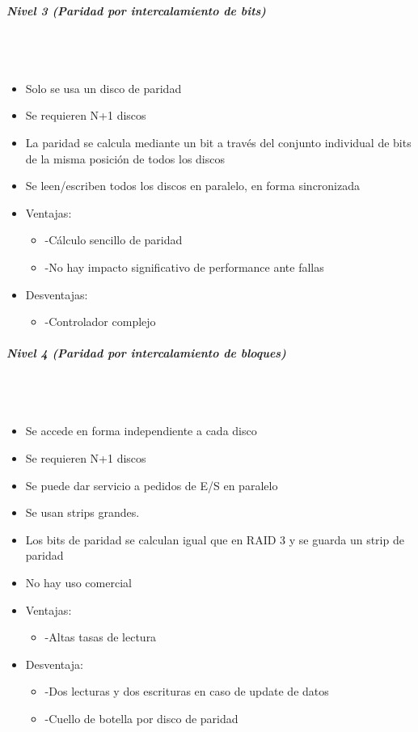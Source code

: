 \subparagraph{Nivel 3 (Paridad por intercalamiento de bits)}\mbox{}\\\\%
\begin{itemize}
\item Solo se usa un disco de paridad
\item Se requieren N+1 discos
\item La paridad se calcula mediante un bit a través del conjunto individual de bits de la misma posición de todos los discos
\item Se leen/escriben todos los discos en paralelo, en forma sincronizada
\item Ventajas:
	\begin{itemize}
	\item -Cálculo sencillo de paridad
	\item -No hay impacto significativo de performance ante fallas
	\end{itemize}
\item Desventajas:
	\begin{itemize}
	\item -Controlador complejo
	\end{itemize}
\end{itemize}

\subparagraph{Nivel 4 (Paridad por intercalamiento de bloques)}\mbox{}\\\\%
\begin{itemize}
\item Se accede en forma independiente a cada disco
\item Se requieren N+1 discos
\item Se puede dar servicio a pedidos de E/S en paralelo
\item Se usan strips grandes.
\item Los bits de paridad se calculan igual que en RAID 3 y se guarda un strip de paridad
\item No hay uso comercial
\item Ventajas:
	\begin{itemize}
	\item -Altas tasas de lectura
	\end{itemize}
\item Desventaja:
	\begin{itemize}
	\item -Dos lecturas y dos escrituras en caso de update de datos
	\item -Cuello de botella por disco de paridad
	\end{itemize}
\end{itemize}

